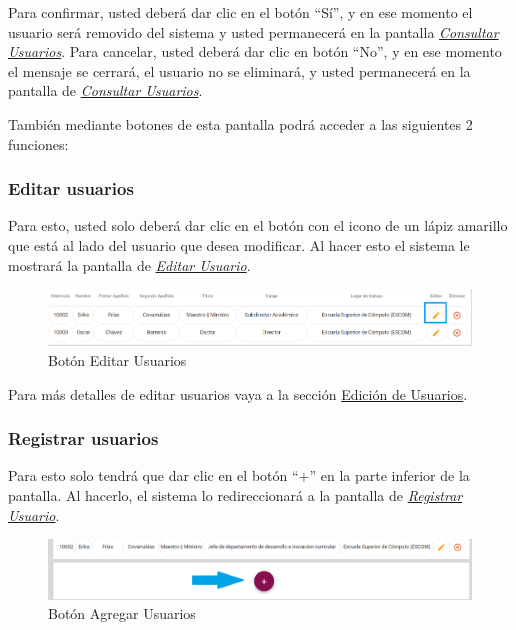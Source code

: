 \begin{enumerate}
\begin{figure}[!hbtp]
  	\end{figure}
  	
  	Para confirmar, usted deberá dar clic en el botón “Sí”, y en ese momento el usuario será removido del sistema y usted permanecerá en la pantalla \hyperlink{consultarUs}{\textit{Consultar Usuarios}}.
  	Para cancelar, usted deberá dar clic en botón “No”, y en ese momento el mensaje se cerrará, el usuario no se eliminará, y usted permanecerá en la pantalla de \hyperlink{consultarUs}{\textit{Consultar Usuarios}}.
  	
  \end{enumerate}
  
  También mediante botones de esta pantalla podrá acceder a las siguientes 2 funciones:
  
  \subsubsection{Editar usuarios}
  
  Para esto, usted solo deberá dar clic en el botón con el icono de un lápiz amarillo que está al lado del usuario que desea modificar. Al hacer esto el sistema le mostrará la pantalla   de \hyperlink{editarUs}{\textit{Editar Usuario}}.
  
  \begin{figure}[!hbtp]
  	\centering
  	\hypertarget{editar}{\includegraphics[width=0.7\linewidth]{images/SP5/BtnEditar}}
  	\caption{Botón Editar Usuarios}
  	\label{editar}
  \end{figure}
  
  Para más detalles de editar usuarios vaya a la sección \hyperlink{editar-user}{Edición de Usuarios}.
  
  \subsubsection{Registrar  usuarios}
  
  Para esto solo tendrá que dar clic en el botón “+” en la parte inferior de la pantalla. Al hacerlo, el sistema  lo redireccionará a la pantalla de \hyperlink{registrarUs}{\textit{Registrar Usuario}}.
  
  \begin{figure}[!hbtp]
  	\centering
  	\hypertarget{add}{\includegraphics[width=0.7\linewidth]{images/SP5/BtnAgregar}}
  	\caption{Botón Agregar Usuarios}
  	\label{add}
  \end{figure}
  
